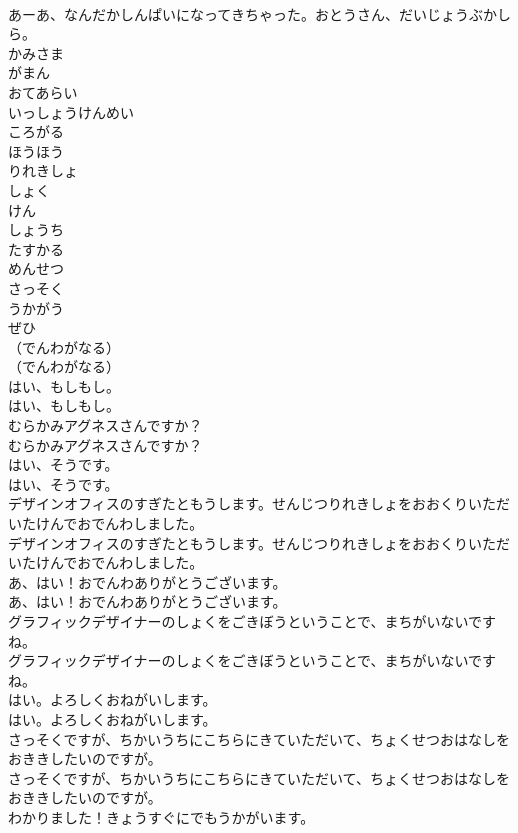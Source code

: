 \documentclass[8pt]{extreport}
\begin{document}
\begin{CJK}{UTF8}{min}
\\	あーあ、なんだかしんぱいになってきちゃった。おとうさん、だいじょうぶかしら。
\\	かみさま
\\	がまん
\\	おてあらい
\\	いっしょうけんめい
\\	ころがる
\\	ほうほう
\\	りれきしょ
\\	しょく
\\	けん
\\	しょうち
\\	たすかる
\\	めんせつ
\\	さっそく
\\	うかがう
\\	ぜひ
\\	（でんわがなる）
\\	（でんわがなる）
\\	はい、もしもし。
\\	はい、もしもし。
\\	むらかみアグネスさんですか？
\\	むらかみアグネスさんですか？
\\	はい、そうです。
\\	はい、そうです。
\\	デザインオフィスのすぎたともうします。せんじつりれきしょをおおくりいただいたけんでおでんわしました。
\\	デザインオフィスのすぎたともうします。せんじつりれきしょをおおくりいただいたけんでおでんわしました。
\\	あ、はい！おでんわありがとうございます。
\\	あ、はい！おでんわありがとうございます。
\\	グラフィックデザイナーのしょくをごきぼうということで、まちがいないですね。
\\	グラフィックデザイナーのしょくをごきぼうということで、まちがいないですね。
\\	はい。よろしくおねがいします。
\\	はい。よろしくおねがいします。
\\	さっそくですが、ちかいうちにこちらにきていただいて、ちょくせつおはなしをおききしたいのですが。
\\	さっそくですが、ちかいうちにこちらにきていただいて、ちょくせつおはなしをおききしたいのですが。
\\	わかりました！きょうすぐにでもうかがいます。

\end{CJK}
\end{document}
